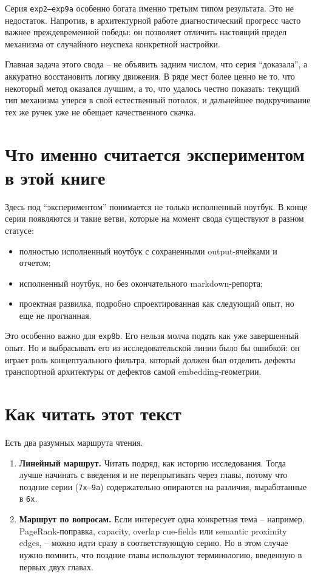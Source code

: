 Серия \texttt{exp2--exp9a} особенно богата именно третьим типом результата.
Это не недостаток. Напротив, в архитектурной работе диагностический прогресс
часто важнее преждевременной победы: он позволяет отличить настоящий предел
механизма от случайного неуспеха конкретной настройки.

\begin{takeaway}
Главная задача этого свода -- не объявить задним числом, что серия ``доказала'',
а аккуратно восстановить логику движения. В ряде мест более ценно не то, что
некоторый метод оказался лучшим, а то, что удалось честно показать: текущий тип
механизма уперся в свой естественный потолок, и дальнейшее подкручивание тех же
ручек уже не обещает качественного скачка.
\end{takeaway}

\section*{Что именно считается экспериментом в этой книге}

Здесь под ``экспериментом'' понимается не только исполненный ноутбук. В конце
серии появляются и такие ветви, которые на момент свода существуют в разном
статусе:

\begin{itemize}[leftmargin=2em]
\item полностью исполненный ноутбук с сохраненными output-ячейками и отчетом;
\item исполненный ноутбук, но без окончательного markdown-репорта;
\item проектная развилка, подробно спроектированная как следующий опыт, но еще
не прогнанная.
\end{itemize}

Это особенно важно для \texttt{exp8b}. Его нельзя молча подать как уже
завершенный опыт. Но и выбрасывать его из исследовательской линии было бы
ошибкой: он играет роль концептуального фильтра, который должен был отделить
дефекты транспортной архитектуры от дефектов самой embedding-геометрии.

\section*{Как читать этот текст}

Есть два разумных маршрута чтения.

\begin{enumerate}[leftmargin=2em]
\item \textbf{Линейный маршрут.} Читать подряд, как историю исследования. Тогда
лучше начинать с введения и не перепрыгивать через главы, потому что поздние
серии (\texttt{7x--9a}) содержательно опираются на различия, выработанные в
\texttt{6x}.
\item \textbf{Маршрут по вопросам.} Если интересует одна конкретная тема --
например, PageRank-поправка, capacity, overlap cue-fields или semantic
proximity edges, -- можно идти сразу в соответствующую серию. Но в этом случае
нужно помнить, что поздние главы используют терминологию, введенную в первых
двух главах.
\end{enumerate}

